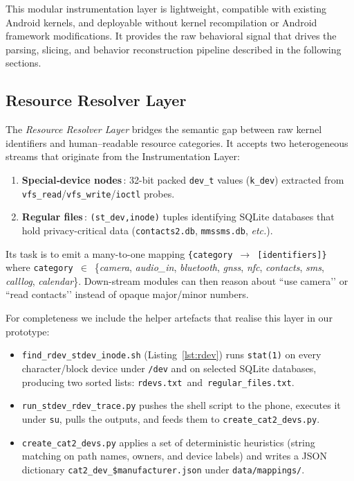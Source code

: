 \documentclass[a4paper,12pt]{report}
\begin{document}
This modular instrumentation layer is lightweight, compatible with existing Android kernels, and deployable without kernel recompilation or Android framework modifications. It provides the raw behavioral signal that drives the parsing, slicing, and behavior reconstruction pipeline described in the following sections.


\subsection{Resource Resolver Layer}

The \emph{Resource Resolver Layer} bridges the semantic gap between
raw kernel identifiers and human–readable resource categories.  It
accepts two heterogeneous streams that originate from the
Instrumentation Layer:

\begin{enumerate}
  \item \textbf{Special‐device nodes}\,: 32-bit packed
        \texttt{dev\_t} values (\texttt{k\_dev}) extracted from
        \texttt{vfs\_read}/\texttt{vfs\_write}/\texttt{ioctl} probes.
  \item \textbf{Regular files}\,: \texttt{(st\_dev,\;inode)} tuples
        identifying SQLite databases that hold privacy-critical data
        (\texttt{contacts2.db}, \texttt{mmssms.db}, \textit{etc.}).
\end{enumerate}

Its task is to emit a many-to-one mapping
\texttt{\{category $\rightarrow$ [identifiers]\}} where
\texttt{category}~$\in$~\{\textit{camera}, \textit{audio\_in},
\textit{bluetooth}, \textit{gnss}, \textit{nfc},
\textit{contacts}, \textit{sms}, \textit{calllog},
\textit{calendar}\}.
Down-stream modules can then reason about ``use camera’’ or ``read
contacts’’ instead of opaque major/minor numbers.

For completeness we include the helper artefacts that realise this
layer in our prototype:

\begin{itemize}
  \item \texttt{find\_rdev\_stdev\_inode.sh} (Listing~\ref{lst:rdev})
        runs \texttt{stat(1)} on every character/block device under
        \texttt{/dev} and on selected SQLite databases, producing two
        sorted lists:
        \texttt{rdevs.txt}~and~\texttt{regular\_files.txt}.
  \item \texttt{run\_stdev\_rdev\_trace.py} pushes the shell script to
        the phone, executes it under \texttt{su}, pulls the outputs,
        and feeds them to
        \texttt{create\_cat2\_devs.py}.
  \item \texttt{create\_cat2\_devs.py} applies a set of deterministic
        heuristics (string matching on path names, owners, and device
        labels) and writes a JSON dictionary
        \texttt{cat2\_dev\_\$manufacturer.json} under
        \texttt{data/mappings/}.
\end{itemize}
\end{document}
